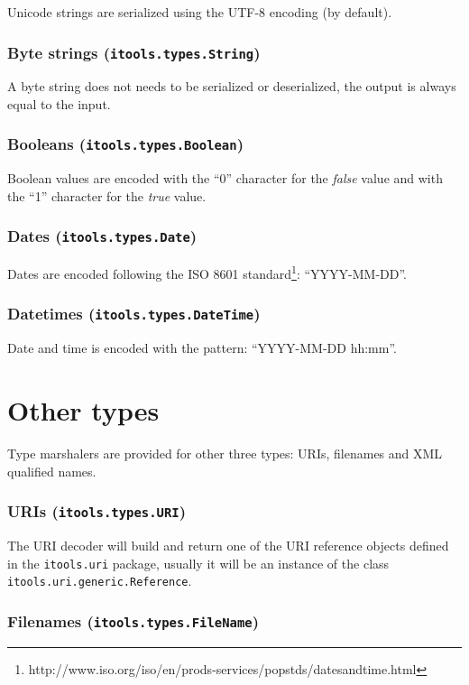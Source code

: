 Unicode strings are serialized using the UTF-8 encoding (by default).

\subsubsection{Byte strings ({\tt itools.types.String})}

A byte string does not needs to be serialized or deserialized, the
output is always equal to the input.

\subsubsection{Booleans ({\tt itools.types.Boolean})}

Boolean values are encoded with the ``0'' character for the {\em false}
value and with the ``1'' character for the {\em true} value.

\subsubsection{Dates ({\tt itools.types.Date})}

Dates are encoded following the ISO 8601 standard\footnote{http://www.iso.org/iso/en/prods-services/popstds/datesandtime.html}: ``YYYY-MM-DD''.

\subsubsection{Datetimes ({\tt itools.types.DateTime})}

Date and time is encoded with the pattern: ``YYYY-MM-DD hh:mm''.

\section{Other types}

Type marshalers are provided for other three types: URIs, filenames
and XML qualified names.


\subsubsection{URIs ({\tt itools.types.URI})}

The URI decoder will build and return one of the URI reference objects
defined in the {\tt itools.uri} package, usually it will be an instance
of the class {\tt itools.uri.generic.Reference}.


\subsubsection{Filenames ({\tt itools.types.FileName})}


